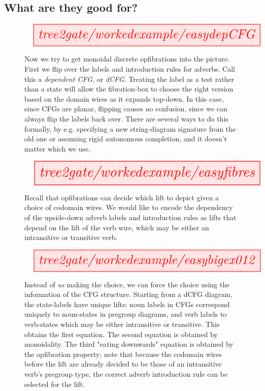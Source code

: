 \clearpage

\subsection{What are they good for?}



\begin{figure}[h!]
\[\resizebox{\textwidth}{!}{\tikzfig{tree2gate/workedexample/easydepCFG}}\]
\caption{
Now we try to get monoidal discrete opfibrations into the picture. First we flip over the labels and introduction rules for adverbs. Call this a \emph{dependent CFG}, or \emph{dCFG}. Treating the label as a test rather than a state will allow the fibration-box to choose the right version based on the domain wires as it expands top-down. In this case, since CFGs are planar, flipping causes no confusion, since we can always flip the labels back over. There are several ways to do this formally, by e.g. specifying a new string-diagram signature from the old one or assuming rigid autonomous completion, and it doesn't matter which we use.
}
\end{figure}

\begin{figure}[h!]
\[\resizebox{\textwidth}{!}{\tikzfig{tree2gate/workedexample/easyfibres}}\]
\caption{
Recall that opfibrations can decide which lift to depict given a choice of codomain wires. We would like to encode the dependency of the upside-down adverb labels and introduction rules as lifts that depend on the lift of the verb wire, which may be either an intransitive or transitive verb.
}
\end{figure}

\begin{figure}[h!]
\[\resizebox{\textwidth}{!}{\tikzfig{tree2gate/workedexample/easybigex012}}\]
\caption{
Instead of \emph{us} making the choice, we can force the choice using the information of the CFG structure. Starting from a dCFG diagram, the state-labels have unique lifts: noun labels in CFGs correspond uniquely to noun-states in pregroup diagrams, and verb labels to verb-states which may be either intransitive or transitive. This obtains the first equation. The second equation is obtained by monoidality. The third "eating downwards" equation is obtained by the opfibration property; note that because the codomain wires before the lift are already decided to be those of an intransitive verb's pregroup type, the correct adverb introduction rule can be selected for the lift.
}
\end{figure}

